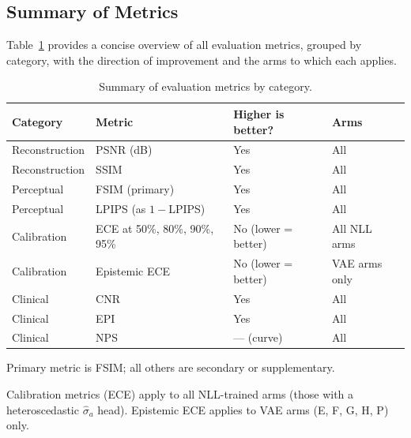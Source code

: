 \documentclass[12pt, a4paper, twoside, openright]{book}
\begin{document}
\subsection{Summary of Metrics}
\label{sec:methods:evaluation:summary}

Table~\ref{tab:methods:metrics} provides a concise overview of all evaluation metrics, grouped by category, with the direction of improvement and the arms to which each applies.

\begin{table}[htbp]
\centering
\caption{Summary of evaluation metrics by category.}
\label{tab:methods:metrics}
\begin{threeparttable}
\begin{tabular}{llll}
\toprule
\textbf{Category} & \textbf{Metric} & \textbf{Higher is better?} & \textbf{Arms} \\
\midrule
Reconstruction & PSNR (dB) & Yes & All \\
Reconstruction & SSIM & Yes & All \\
Perceptual & FSIM (primary) & Yes & All \\
Perceptual & LPIPS (as $1-$LPIPS) & Yes & All \\
Calibration & ECE at 50\%, 80\%, 90\%, 95\% & No (lower = better) & All NLL arms \\
Calibration & Epistemic ECE & No (lower = better) & VAE arms only \\
Clinical & CNR & Yes & All \\
Clinical & EPI & Yes & All \\
Clinical & NPS & --- (curve) & All \\
\bottomrule
\end{tabular}
\begin{tablenotes}
\footnotesize
\item Primary metric is FSIM; all others are secondary or supplementary.
\item Calibration metrics (ECE) apply to all NLL-trained arms (those with a heteroscedastic $\hat{\sigma}_a$ head). Epistemic ECE applies to VAE arms (E, F, G, H, P) only.
\end{tablenotes}
\end{threeparttable}
\end{table}
\end{document}
